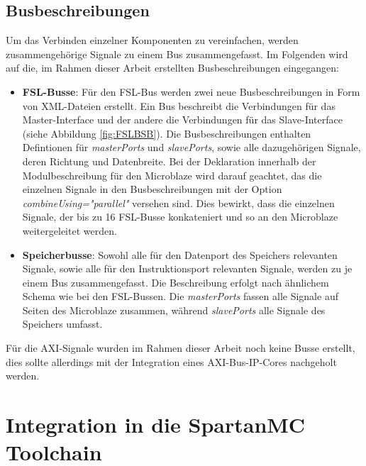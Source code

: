 \subsection{Busbeschreibungen}\label{subsec:BusDesc}
Um das Verbinden einzelner Komponenten zu vereinfachen, werden zusammengehörige Signale zu einem Bus zusammengefasst. Im Folgenden wird auf die, im Rahmen dieser Arbeit erstellten Busbeschreibungen eingegangen:
\begin{itemize}
\item \textbf{FSL-Busse}: Für den FSL-Bus werden zwei neue Busbeschreibungen in Form von XML-Dateien erstellt. Ein Bus beschreibt die Verbindungen für das Master-Interface und der andere die Verbindungen für das Slave-Interface (siehe Abbildung \ref{fig:FSLBSB}). Die Busbeschreibungen enthalten Defintionen für \textit{masterPorts} und \textit{slavePorts}, sowie alle dazugehörigen Signale, deren Richtung und Datenbreite.
Bei der Deklaration innerhalb der Modulbeschreibung für den Microblaze wird darauf geachtet, das die einzelnen Signale in den Busbeschreibungen mit der Option \textit{combineUsing="parallel"} versehen sind. Dies bewirkt, dass die einzelnen Signale, der bis zu 16 FSL-Busse konkateniert und so an den Microblaze weitergeleitet werden.
\item \textbf{Speicherbusse}: Sowohl alle für den Datenport des Speichers relevanten Signale, sowie alle für den Instruktionsport relevanten Signale, werden zu je einem Bus zusammengefasst. Die Beschreibung erfolgt nach ähnlichem Schema wie bei den FSL-Bussen. Die \textit{masterPorts} fassen alle Signale auf Seiten des Microblaze zusammen, während \textit{slavePorts} alle Signale des Speichers umfasst.
\end{itemize}
Für die AXI-Signale wurden im Rahmen dieser Arbeit noch keine Busse erstellt, dies sollte allerdings mit der Integration eines AXI-Bus-IP-Cores nachgeholt werden.

\section{Integration in die SpartanMC Toolchain}
